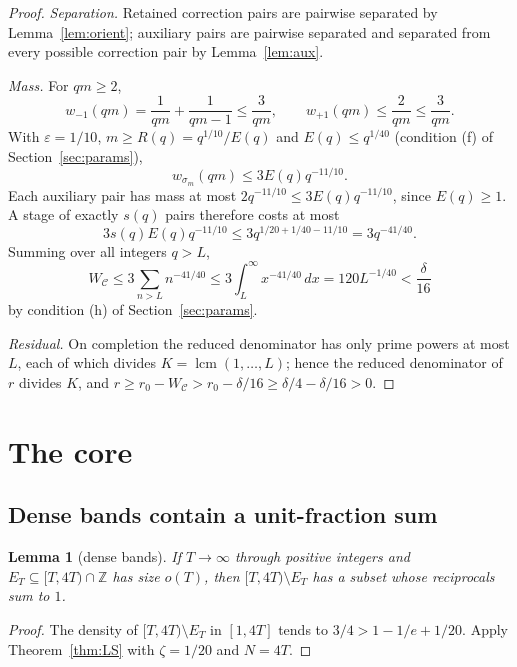 \documentclass[11pt,letterpaper]{article}
\numberwithin{equation}{section}
\theoremstyle{plain}
\newtheorem{lemma}{Lemma}
\theoremstyle{remark}
\newcommand{\Z}{\mathbb Z}
\newcommand{\cC}{\mathcal C}
\newcommand{\lcm}{\operatorname{lcm}}
\begin{document}
\begin{proof}
\emph{Separation.} Retained correction pairs are pairwise separated by Lemma~\ref{lem:orient}; auxiliary pairs are pairwise separated and separated from every possible correction pair by Lemma~\ref{lem:aux}.

\emph{Mass.} For $qm\ge2$,
\[
w_{-1}(qm)=\frac1{qm}+\frac1{qm-1}\le\frac3{qm},\qquad w_{+1}(qm)\le\frac2{qm}\le\frac3{qm}.
\]
With $\varepsilon=1/10$, $m\ge R(q)=q^{1/10}/E(q)$ and $E(q)\le q^{1/40}$ (condition (f) of Section~\ref{sec:params}),
\[
w_{\sigma_m}(qm)\le3E(q)q^{-11/10}.
\]
Each auxiliary pair has mass at most $2q^{-11/10}\le3E(q)q^{-11/10}$, since $E(q)\ge1$. A stage of exactly $s(q)$ pairs therefore costs at most
\begin{equation}\label{eq:D6}
3s(q)E(q)q^{-11/10}\le3q^{1/20+1/40-11/10}=3q^{-41/40}.
\end{equation}
Summing over all integers $q>L$,
\begin{equation}\label{eq:D7}
W_{\cC}\le3\sum_{n>L}n^{-41/40}\le3\int_L^\infty x^{-41/40}\,dx=120L^{-1/40}<\frac\delta{16}
\end{equation}
by condition (h) of Section~\ref{sec:params}.

\emph{Residual.} On completion the reduced denominator has only prime powers at most $L$, each of which divides $K=\lcm(1,\ldots,L)$; hence the reduced denominator of $r$ divides $K$, and $r\ge r_0-W_{\cC}>r_0-\delta/16\ge\delta/4-\delta/16>0$.
\end{proof}

\section{The core}\label{sec:core}

\subsection{Dense bands contain a unit-fraction sum}\label{sec:dense}

\begin{lemma}[dense bands]\label{lem:dense}
If $T\to\infty$ through positive integers and $E_T\subseteq[T,4T)\cap\Z$ has size $o(T)$, then $[T,4T)\setminus E_T$ has a subset whose reciprocals sum to $1$.
\end{lemma}

\begin{proof}
The density of $[T,4T)\setminus E_T$ in $[1,4T]$ tends to $3/4>1-1/e+1/20$. Apply Theorem~\ref{thm:LS} with $\zeta=1/20$ and $N=4T$.
\end{proof}
\end{document}
